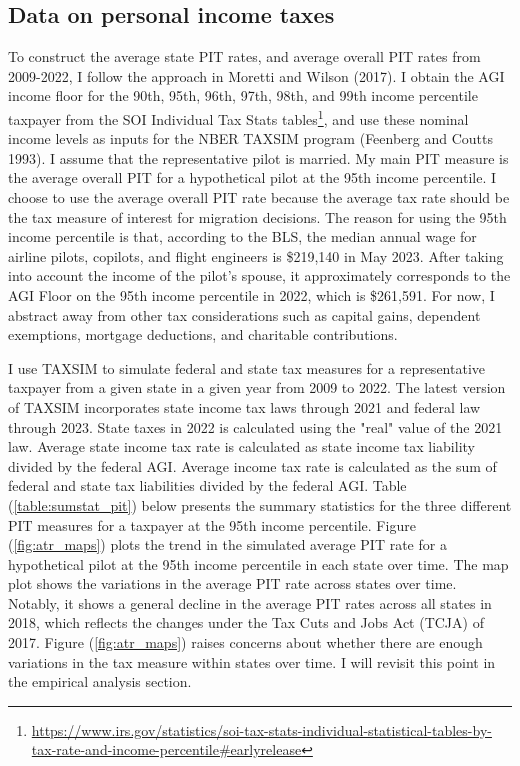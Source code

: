 \documentclass[11pt]{article}
\begin{document}
\subsection{Data on personal income taxes}

To construct the average state PIT rates, and average overall PIT rates from 2009-2022, I follow the approach in Moretti and Wilson (2017). I obtain the AGI income floor for the 90th, 95th, 96th, 97th, 98th, and 99th income percentile taxpayer from the SOI Individual Tax Stats tables\footnote{\url{https://www.irs.gov/statistics/soi-tax-stats-individual-statistical-tables-by-tax-rate-and-income-percentile\#earlyrelease}}, and use these nominal income levels as inputs for the NBER TAXSIM program (Feenberg and Coutts 1993). I assume that the representative pilot is married. My main PIT measure is the average overall PIT for a hypothetical pilot at the 95th income percentile. I choose to use the average overall PIT rate because the average tax rate should be the tax measure of interest for migration decisions. The reason for using the 95th income percentile is that, according to the BLS, the median annual wage for airline pilots, copilots, and flight engineers is \$219,140 in May 2023. After taking into account the income of the pilot's spouse, it approximately corresponds to the AGI Floor on the 95th income percentile in 2022, which is \$261,591. For now, I abstract away from other tax considerations such as capital gains, dependent exemptions, mortgage deductions, and charitable contributions.

I use TAXSIM to simulate federal and state tax measures for a representative taxpayer from a given state in a given year from 2009 to 2022. The latest version of TAXSIM incorporates state income tax laws through 2021 and federal law through 2023. State taxes in 2022 is calculated using the "real" value of the 2021 law. Average state income tax rate is calculated as state income tax liability divided by the federal AGI. Average income tax rate is calculated as the sum of federal and state tax liabilities divided by the federal AGI. Table (\ref{table:sumstat_pit}) below presents the summary statistics for the three different PIT measures for a taxpayer at the 95th income percentile. Figure (\ref{fig:atr_maps}) plots the trend in the simulated average PIT rate for a hypothetical pilot at the 95th income percentile in each state over time. The map plot shows the variations in the average PIT rate across states over time. Notably, it shows a general decline in the average PIT rates across all states in 2018, which reflects the changes under the Tax Cuts and Jobs Act (TCJA) of 2017. Figure (\ref{fig:atr_maps}) raises concerns about whether there are enough variations in the tax measure within states over time. I will revisit this point in the empirical analysis section.
\end{document}

